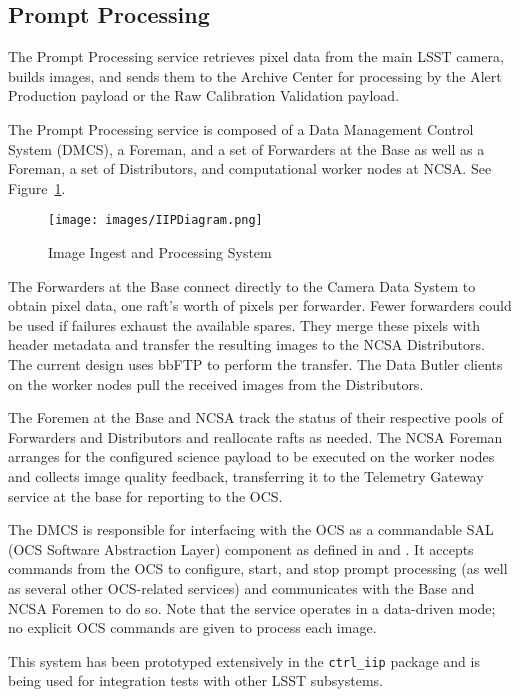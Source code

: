 \documentclass[DM,toc]{lsstdoc}
\begin{document}
\subsection{Prompt Processing}\label{prompt-processing}

The Prompt Processing service retrieves pixel data from the main LSST camera,
builds images, and sends them to the Archive Center for processing by the Alert Production payload or the Raw Calibration Validation payload.

The Prompt Processing service is composed of a Data Management Control System
(DMCS), a Foreman, and a set of Forwarders at the Base as well as a Foreman, a
set of Distributors, and computational worker nodes at NCSA.  See Figure~\ref{fig:iipsystem}.

\begin{figure}
\centering
\texttt{[image: images/IIPDiagram.png]}
\caption{Image Ingest and Processing System}
\label{fig:iipsystem}
\end{figure}

The Forwarders at the Base connect directly to the Camera Data System to obtain
pixel data, one raft's worth of pixels per forwarder.  Fewer forwarders could
be used if failures exhaust the available spares.  They merge these pixels with
header metadata and transfer the resulting images to the NCSA Distributors.
The current design uses bbFTP to perform the transfer.  The Data Butler clients
on the worker nodes pull the received images from the Distributors.

The Foremen at the Base and NCSA track the status of their respective pools of
Forwarders and Distributors and reallocate rafts as needed.
The NCSA Foreman arranges for
the configured science payload to be executed on the worker nodes and collects
image quality feedback, transferring it to the Telemetry Gateway service at the
base for reporting to the OCS.

The DMCS is responsible for interfacing with the OCS as a commandable SAL
(OCS Software Abstraction Layer)
component as defined in  and .  It accepts
commands from the OCS to configure, start, and stop prompt processing (as well
as several other OCS-related services) and communicates with the Base and NCSA
Foremen to do so.  Note that the service operates in a data-driven mode; no
explicit OCS commands are given to process each image.

This system has been prototyped extensively in the \texttt{ctrl\_iip} package
and is being used for integration tests with other LSST subsystems.
\end{document}
